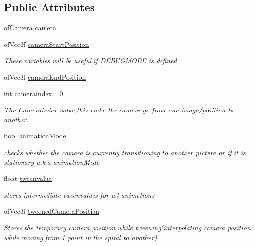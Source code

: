 \subsection*{Public Attributes}
\begin{DoxyCompactItemize}
\item 
of\-Camera \hyperlink{group___camera_ga0278ee237cbbd881252d6273b131bb55}{camera}
\item 
of\-Vec3f \hyperlink{group___camera_gac01013264b9988207e7fd9e0a486ff2f}{camera\-Start\-Position}
\begin{DoxyCompactList}\small\item\em These variables will be useful if D\-E\-B\-U\-G\-M\-O\-D\-E is defined. \end{DoxyCompactList}\item 
of\-Vec3f \hyperlink{group___camera_gad3319d9cd3cb00e898f4f602b879efad}{camera\-End\-Position}
\item 
int \hyperlink{group___camera_ga4ca3a51642dedbf37f2b9f6ef96510c7}{cameraindex} =0
\begin{DoxyCompactList}\small\item\em The Cameraindex value,this make the camera go from one image/position to another. \end{DoxyCompactList}\item 
bool \hyperlink{group___camera_animation_ga2a5d49fd1f7f50f745f56095a1fa0099}{animation\-Mode}
\begin{DoxyCompactList}\small\item\em checks whether the camera is currently transitioning to another picture or if it is stationary a.\-k.\-a animation\-Mode \end{DoxyCompactList}\item 
float \hyperlink{group___camera_animation_gadd9ab1aa902948afbdf1c6db0dfde385}{tweenvalue}
\begin{DoxyCompactList}\small\item\em stores intermediate tweenvalues for all animations \end{DoxyCompactList}\item 
of\-Vec3f \hyperlink{group___camera_animation_gae9f60797c1c5d9f1ac06e1d6a5259957}{tweened\-Camera\-Position}
\begin{DoxyCompactList}\small\item\em Stores the temporary camera position while tweening(interpolating camera position while moving from 1 point in the spiral to another) \end{DoxyCompactList}\item 

\end{DoxyCompactItemize}
